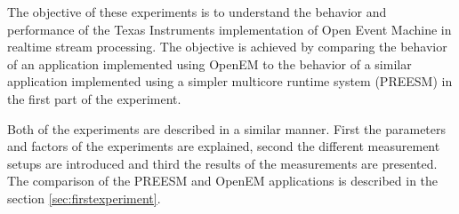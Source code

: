 The objective of these experiments is to understand the behavior and performance of the Texas Instruments implementation of Open Event Machine in realtime stream processing. The objective is achieved by comparing the behavior of an application implemented using OpenEM to the behavior of a similar application implemented using a simpler multicore runtime system (PREESM) in the first part of the experiment.

Both of the experiments are described in a similar manner. First the parameters and factors of the experiments are explained, second the different measurement setups are introduced and third the results of the measurements are presented. The comparison of the PREESM and OpenEM applications is described in the section \ref{sec:firstexperiment}.


